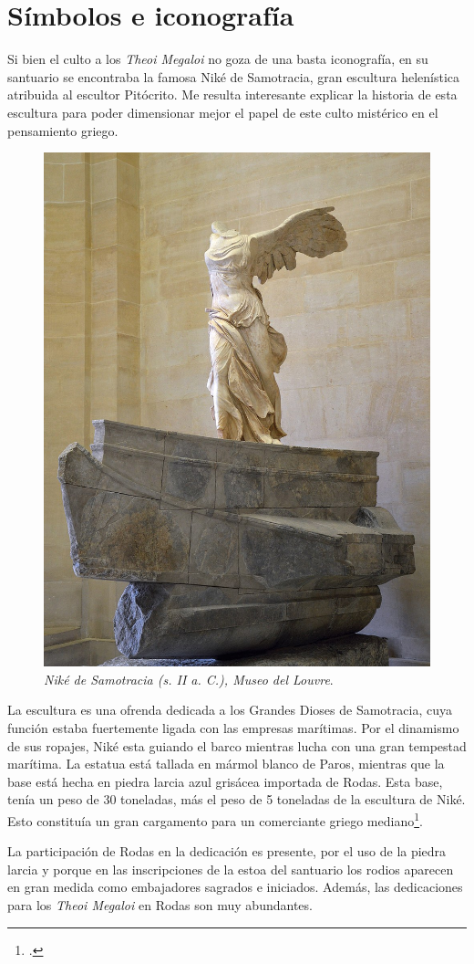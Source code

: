\section{Símbolos e iconografía} 

Si bien el culto a los \textit{Theoi Megaloi} no goza de una basta iconografía, en su santuario se encontraba la famosa Niké de Samotracia, gran escultura helenística atribuida al escultor Pitócrito. Me resulta interesante explicar la historia de esta escultura para poder dimensionar mejor el papel de este culto mistérico en el pensamiento griego.

\begin{figure}[h!]
	\centering
	\includegraphics[width=0.45\linewidth]{Imagenes/VictoriaSamotracia}
	\caption{\textit{Niké de Samotracia (s. II a. C.), Museo del Louvre}.}
	\label{fig:nike-samotracia}
\end{figure}

La escultura es una ofrenda dedicada a los Grandes Dioses de Samotracia, cuya función estaba fuertemente ligada con las empresas marítimas. Por el dinamismo de sus ropajes, Niké esta guiando el barco mientras lucha con una gran tempestad marítima. La estatua está tallada en mármol blanco de Paros, mientras que la base está hecha en piedra larcia azul grisácea importada de Rodas. Esta base, tenía un peso de 30 toneladas, más el peso de 5 toneladas de la escultura de Niké. Esto constituía un gran cargamento para un comerciante griego mediano\footcite[403]{stewartNikeSamothraceAnother2016}. 

La participación de Rodas en la dedicación es presente, por el uso de la piedra larcia y porque en las inscripciones de la estoa del santuario los rodios aparecen en gran medida como embajadores sagrados e iniciados. Además, las dedicaciones para los \textit{Theoi Megaloi} en Rodas son muy abundantes.

